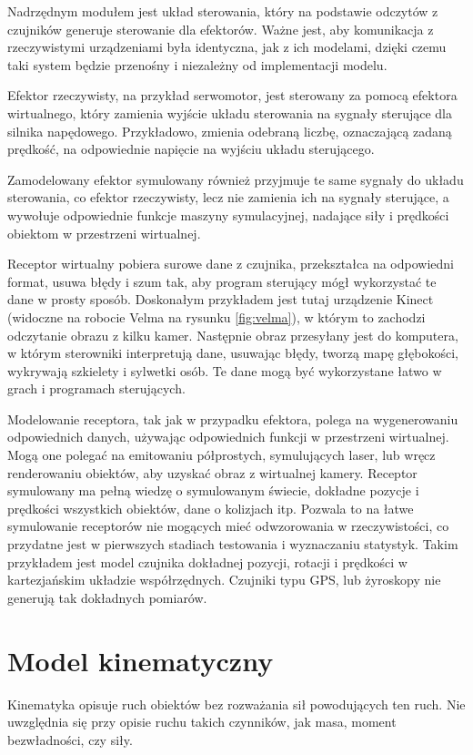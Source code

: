 	Nadrzędnym modułem jest układ sterowania, który na podstawie odczytów z czujników generuje sterowanie dla efektorów.
	Ważne jest, aby komunikacja z rzeczywistymi urządzeniami była identyczna, jak z ich modelami, dzięki czemu taki system będzie przenośny i niezależny od implementacji modelu.

	Efektor rzeczywisty, na przykład serwomotor, jest sterowany za pomocą efektora wirtualnego, który zamienia wyjście układu sterowania na sygnały sterujące dla silnika napędowego.
	Przykładowo, zmienia odebraną liczbę, oznaczającą zadaną prędkość, na odpowiednie napięcie na wyjściu układu sterującego.

	Zamodelowany efektor symulowany również przyjmuje te same sygnały do układu sterowania, co efektor rzeczywisty, 
	lecz nie zamienia ich na sygnały sterujące, a wywołuje odpowiednie funkcje maszyny symulacyjnej, nadające siły i prędkości obiektom w przestrzeni wirtualnej.

	Receptor wirtualny pobiera surowe dane z czujnika, przekształca na odpowiedni format, usuwa błędy i szum tak, aby program sterujący mógł wykorzystać te dane w prosty sposób. 
	Doskonałym przykładem jest tutaj urządzenie Kinect (widoczne na robocie Velma na rysunku \ref{fig:velma}), w którym to zachodzi odczytanie obrazu z kilku kamer.
	Następnie obraz przesyłany jest do komputera, w którym sterowniki interpretują dane, usuwając błędy, tworzą mapę głębokości, wykrywają szkielety i sylwetki osób.
	Te dane mogą być wykorzystane łatwo w grach i programach sterujących.

	Modelowanie receptora, tak jak w przypadku efektora, polega na wygenerowaniu odpowiednich danych, używając odpowiednich funkcji w przestrzeni wirtualnej.
	Mogą one polegać na emitowaniu półprostych, symulujących laser, lub wręcz renderowaniu obiektów, aby uzyskać obraz z wirtualnej kamery.
	Receptor symulowany ma pełną wiedzę o symulowanym świecie, dokładne pozycje i prędkości wszystkich obiektów, dane o kolizjach itp. 
	Pozwala to na łatwe symulowanie receptorów nie mogących mieć odwzorowania w rzeczywistości, co przydatne jest w pierwszych stadiach testowania i wyznaczaniu statystyk.
	Takim przykładem jest model czujnika dokładnej pozycji, rotacji i prędkości w kartezjańskim układzie współrzędnych. 
	Czujniki typu GPS, lub żyroskopy nie generują tak dokładnych pomiarów.


\section{Model kinematyczny}
	\label{sec:pseudovelma}
	Kinematyka opisuje ruch obiektów bez rozważania sił powodujących ten ruch.
	Nie uwzględnia się przy opisie ruchu takich czynników, jak masa, moment bezwładności, czy siły.
	
